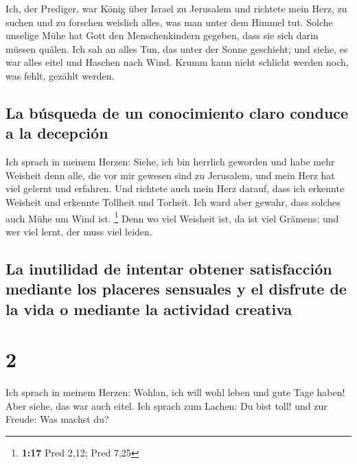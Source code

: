  Ich, der Prediger, war König über Israel zu Jerusalem
 und richtete mein Herz, zu suchen und zu forschen
weislich alles, was man unter dem Himmel tut. Solche unselige Mühe hat
Gott den Menschenkindern gegeben, dass sie sich darin müssen quälen.
 Ich sah an alles Tun, das unter der Sonne geschieht; und
siehe, es war alles eitel und Haschen nach Wind.  Krumm
kann nicht schlicht werden noch, was fehlt, gezählt werden.

\hypertarget{la-buxfasqueda-de-un-conocimiento-claro-conduce-a-la-decepciuxf3n}{%
\subsection{La búsqueda de un conocimiento claro conduce a la
decepción}\label{la-buxfasqueda-de-un-conocimiento-claro-conduce-a-la-decepciuxf3n}}

 Ich sprach in meinem Herzen: Siehe, ich bin herrlich
geworden und habe mehr Weisheit denn alle, die vor mir gewesen sind zu
Jerusalem, und mein Herz hat viel gelernt und erfahren. 
Und richtete auch mein Herz darauf, dass ich erkennte Weisheit und
erkennte Tollheit und Torheit. Ich ward aber gewahr, dass solches auch
Mühe um Wind ist. \footnote{\textbf{1:17} Pred 2,12; Pred 7,25}
 Denn wo viel Weisheit ist, da ist viel Grämens; und wer
viel lernt, der muss viel leiden.

\hypertarget{la-inutilidad-de-intentar-obtener-satisfacciuxf3n-mediante-los-placeres-sensuales-y-el-disfrute-de-la-vida-o-mediante-la-actividad-creativa}{%
\subsection{La inutilidad de intentar obtener satisfacción mediante los
placeres sensuales y el disfrute de la vida o mediante la actividad
creativa}\label{la-inutilidad-de-intentar-obtener-satisfacciuxf3n-mediante-los-placeres-sensuales-y-el-disfrute-de-la-vida-o-mediante-la-actividad-creativa}}

\hypertarget{section-1}{%
\section{2}\label{section-1}}

 Ich sprach in meinem Herzen: Wohlan, ich will wohl leben
und gute Tage haben! Aber siehe, das war auch eitel.  Ich
sprach zum Lachen: Du bist toll! und zur Freude: Was machst du?

